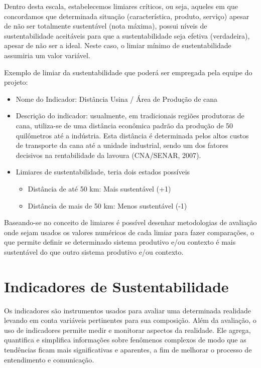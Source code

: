 Dentro desta escala, estabelecemos limiares críticos, ou seja, aqueles
em que concordamos que determinada situação (característica, produto,
serviço) apesar de não ser totalmente sustentável (nota máxima), possui
níveis de sustentabilidade aceitáveis para que a sustentabilidade
seja efetiva (verdadeira), apesar de não ser a ideal. Neste caso,
o limiar mínimo de sustentabilidade assumiria um valor variável.

Exemplo de limiar da sustentabilidade que poderá ser empregada pela
equipe do projeto:
\begin{itemize}
\item Nome do Indicador: Distância Usina / Área de Produção de cana
\item Descrição do indicador: usualmente, em tradicionais regiões produtoras
de cana, utiliza-se de uma distância econômica padrão da produção
de 50 quilômetros até a indústria. Esta distância é determinada pelos
altos custos de transporte da cana até a unidade industrial, sendo
um dos fatores decisivos na rentabilidade da lavoura (CNA/SENAR, 2007).
\item Limiares de sustentabilidade, teria dois estados possíveis 

\begin{itemize}
\item Distância de até 50 km: Mais sustentável (+1)
\item Distância de mais de 50 km: Menos sustentável (-1)
\end{itemize}
\end{itemize}
Baseando-se no conceito de limiares é possível desenhar metodologias
de avaliação onde sejam usados os valores numéricos de cada limiar
para fazer comparações, o que permite definir se determinado sistema
produtivo e/ou contexto é mais sustentável do que outro sistema produtivo
e/ou contexto.

\section{Indicadores de Sustentabilidade}

Os indicadores são instrumentos usados para avaliar uma determinada
realidade levando em conta variáveis pertinentes para sua composição.
Além da avaliação, o uso de indicadores permite medir e monitorar
aspectos da realidade. Ele agrega, quantifica e simplifica informações
sobre fenômenos complexos de modo que as tendências ficam mais significativas
e aparentes, a fim de melhorar o processo de entendimento e comunicação\citep{bossel1999indicators,van2005indicadores}.

